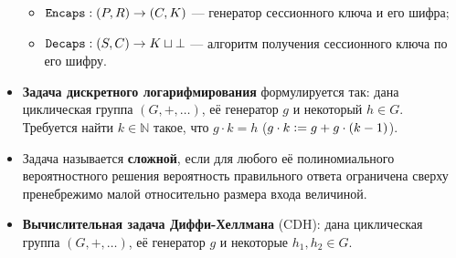 \documentclass[a4paper,14pt]{extarticle}
\begin{document}
\begin{itemize}
\begin{itemize}
            \item $\verb|Encaps|: (P, R) \to (C, K)$ --- генератор сессионного
                ключа и его шифра;
            \item $\verb|Decaps|: (S, C) \to K \sqcup \bot$ --- алгоритм
                получения сессионного ключа по его шифру.
        \end{itemize}
    \item \textbf{Задача дискретного логарифмирования} формулируется так: дана
        циклическая группа $(G, +, \dots)$, её генератор $g$ и некоторый
        $h \in G$. Требуется найти $k \in \mathbb{N}$ такое, что
        $g \cdot k = h$ ($g \cdot k \vcentcolon= g + g \cdot (k - 1)$).
    \item Задача называется \textbf{сложной}, если для любого её полиномиального
        вероятностного решения вероятность правильного ответа ограничена сверху
        пренебрежимо малой относительно размера входа величиной.
    \item \textbf{Вычислительная задача Диффи-Хеллмана} (CDH): дана циклическая
        группа $(G, +, \dots)$, её генератор $g$ и некоторые $h_1, h_2 \in G$.
\end{itemize}

\newpage

\printbibliography[heading=bibintoc]
\end{document}
